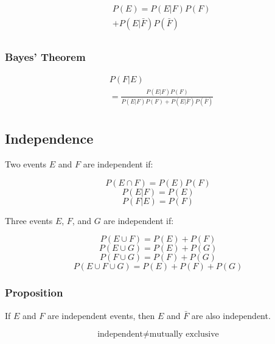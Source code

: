       \begin{align*}
             & P(E) = P(E|F)P(F)        \\
             & + P(E|\bar{F})P(\bar{F}) \\
      \end{align*}

      \subsubsection*{Bayes' Theorem}

      \begin{align*}
             & P(F|E)                                                   \\
             & = \frac{P(E|F)P(F)}{P(E|F)P(F) + P(E|\bar{F})P(\bar{F})} \\
      \end{align*}

      \subsection*{Independence}

      Two events $E$ and $F$ are independent if:

$$ P(E \cap F) = P(E)P(F) $$
$$ P(E|F) = P(E) $$
$$ P(F|E) = P(F) $$

      Three events $E$, $F$, and $G$ are independent if:

$$ P(E \cup F) = P(E) + P(F) $$
$$ P(E \cup G) = P(E) + P(G) $$
$$ P(F \cup G) = P(F) + P(G) $$
$$ P(E \cup F \cup G) = P(E) + P(F) + P(G) $$

      \subsubsection*{Proposition}

      If $E$ and $F$ are independent events, then $E$ and $\bar{F}$ are also independent.

$$ \text{independent} \neq \text{mutually exclusive} $$